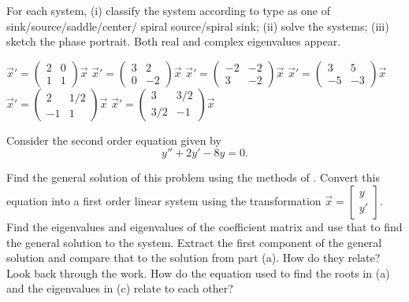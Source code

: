 \begin{exercise}\ansMark%
For each system, (i) classify the system according to type as one of sink/source/saddle/center/ spiral source/spiral sink; (ii) solve the systems; (iii) sketch the phase portrait. Both real and complex eigenvalues appear. %
\begin{tasks}
\task $\vec{x}'=\begin{pmatrix} 2&0 \\ 1&1 \end{pmatrix}\vec{x}$ %
\task $\vec{x}'=\begin{pmatrix} 3& 2\\ 0&-2 \end{pmatrix}\vec{x}$ %
\task $\vec{x}'=\begin{pmatrix} -2& -2\\ 3& -2\end{pmatrix}\vec{x}$ %
\task $\vec{x}'=\begin{pmatrix} 3& 5\\ -5& -3  \end{pmatrix}\vec{x}$ %
\task $\vec{x}'=\begin{pmatrix} 2& 1/2 \\-1 & 1  \end{pmatrix}\vec{x}$ %
\task $\vec{x}'=\begin{pmatrix} 3& 3/2\\ 3/2 & -1 \end{pmatrix}\vec{x}$ %
\end{tasks}
\end{exercise}
%

\begin{exercise}
Consider the second order equation given by
\begin{equation*}
y'' + 2y' - 8y = 0.
\end{equation*}
\begin{tasks}
\task Find the general solution of this problem using the methods of .
\task Convert this equation into a first order linear system using the transformation $\vec{x} = \left[ \begin{smallmatrix} y \\ y' \end{smallmatrix} \right]$. 
\task Find the eigenvalues and eigenvalues of the coefficient matrix and use that to find the general solution to the system.
\task Extract the first component of the general solution and compare that to the solution from part (a). How do they relate?
\task Look back through the work. How do the equation used to find the roots in (a) and the eigenvalues in (c) relate to each other?
\end{tasks}
\end{exercise}

